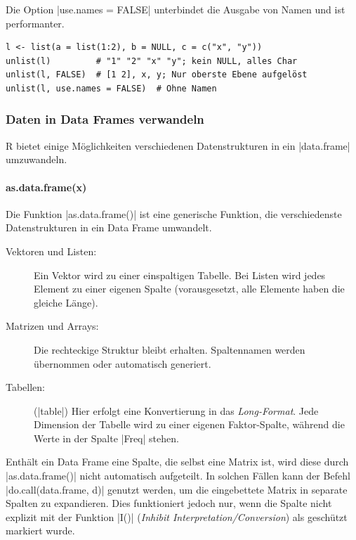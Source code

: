 \documentclass[10pt,twocolumn]{scrartcl}
\renewcommand{\lstinline}{\mycoloredinline}
\begin{document}
Die Option \lstinline|use.names = FALSE| unterbindet die Ausgabe von Namen und ist performanter.

\begin{lstlisting}
l <- list(a = list(1:2), b = NULL, c = c("x", "y"))
unlist(l)         # "1" "2" "x" "y"; kein NULL, alles Char
unlist(l, FALSE)  # [1 2], x, y; Nur oberste Ebene aufgelöst
unlist(l, use.names = FALSE)  # Ohne Namen
\end{lstlisting}


\subsubsection{Daten in Data Frames verwandeln}

R bietet einige Möglichkeiten verschiedenen Datenstrukturen in ein \lstinline|data.frame| umzuwandeln.


\paragraph{as.data.frame(x)}

Die Funktion \lstinline|as.data.frame()| ist eine generische Funktion, die verschiedenste Datenstrukturen in ein Data Frame umwandelt.

\begin{description}
\item[Vektoren und Listen:] Ein Vektor wird zu einer einspaltigen Tabelle. Bei Listen wird jedes Element zu einer eigenen Spalte (vorausgesetzt, alle Elemente haben die gleiche Länge).
\item[Matrizen und Arrays:] Die rechteckige Struktur bleibt erhalten. Spaltennamen werden übernommen oder automatisch generiert.
\item[Tabellen:] (\lstinline|table|) Hier erfolgt eine Konvertierung in das \emph{Long-Format}. Jede Dimension der Tabelle wird zu einer eigenen Faktor-Spalte, während die Werte in der Spalte \lstinline|Freq| stehen.
\end{description}

Enthält ein Data Frame eine Spalte, die selbst eine Matrix ist, wird diese durch \lstinline|as.data.frame()| nicht automatisch aufgeteilt. In solchen Fällen kann der Befehl \lstinline|do.call(data.frame, d)| genutzt werden, um die eingebettete Matrix in separate Spalten zu expandieren. Dies funktioniert jedoch nur, wenn die Spalte nicht explizit mit der Funktion \lstinline|I()| (\emph{Inhibit Interpretation/Conversion}) als geschützt markiert wurde.
\end{document}
